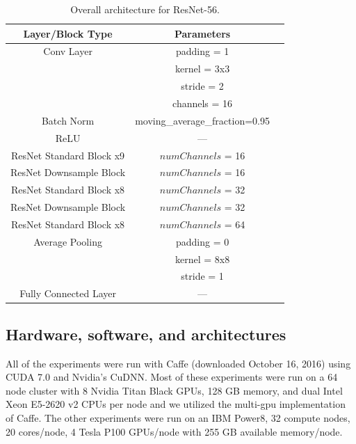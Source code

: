 \documentclass{article}
\begin{document}
	\begin{table}[tbh]
		\begin{center}
			\caption{Overall architecture for ResNet-56. }
			\begin{tabular}{| c | c | c | }
				\hline
				Layer/Block Type & Parameters \\
				\hline \hline
				Conv Layer & padding = 1 \\
				& kernel = 3x3 \\
				& stride = 2 \\
				& channels = 16 \\
				\hline
				Batch Norm & moving\_average\_fraction=0.95 \\
				\hline
				ReLU & --- \\
				\hline
				ResNet Standard Block x9 & $numChannels$ = 16 \\
				\hline
				ResNet Downsample Block & $numChannels$ = 16 \\
				\hline
				ResNet Standard Block x8 & $numChannels$ = 32 \\
				\hline
				ResNet Downsample Block & $numChannels$ = 32 \\
				\hline
				ResNet Standard Block x8 & $numChannels$ = 64 \\
				\hline
				Average Pooling & padding = 0 \\
				& kernel = 8x8 \\
				& stride = 1 \\
				\hline
				Fully Connected Layer & --- \\
				\hline
				
			\end{tabular}
			\label{table:resnet56_arch}
		\end{center}
	\end{table}
	
	
	
	\subsection{Hardware, software, and architectures}
	
	All of the experiments were run with Caffe (downloaded October 16, 2016) using CUDA 7.0 and Nvidia's CuDNN.  
	Most of these experiments were run on a 64 node cluster with 8 Nvidia Titan Black GPUs, 128 GB memory, and dual Intel Xeon E5-2620 v2 CPUs per node and we utilized the multi-gpu implementation of Caffe.  The other experiments were run on an IBM Power8, 32 compute nodes, 20 cores/node, 4 Tesla P100 GPUs/node with 255 GB available memory/node.
	
\end{document}
